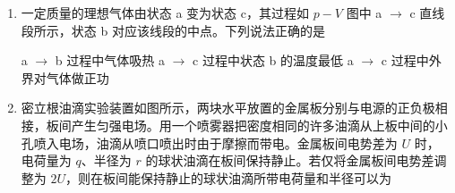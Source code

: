 \documentclass[\gkver]{gaokaozhenti}
\begin{document}
\begin{enumerate}
{	C．已知同步卫星的周期为 $24\Uh$，则根据角速度和周期的关系有 $\omega=\frac{2\pi}{T}$

	由于 $T_\text{同} > T_\text{组合体}$，则组合体的角速度大小比地球同步卫星的大，C 正确；

	D．由题知组合体在地球引力作用下绕地球做圆周运动，有 $G\frac{Mm}{r^{2}}=m\frac{4\pi^{2}}{T^{2}}r$

	整理有 $T=2\pi\sqrt{\frac{r^{3}}{GM}}$

	由于 $T_\text{同} > T_\text{组合体}$，则 $r_\text{同} > r_\text{组合体}$，且同步卫星和组合体在天上有 $ma=G\frac{Mm}{r^{2}}$

	则有 $a_\text{同} < a_\text{组合体}$，D 错误。

	故选 C。
}

\item
一定质量的理想气体由状态 a 变为状态 c，其过程如 $p-V$ 图中 a $\to$ c 直线段所示，状态 b 对应该线段的中点。下列说法正确的是 


{a $\to$ b 过程中气体吸热}
{a $\to$ c 过程中状态 b 的温度最低}
{a $\to$ c 过程中外界对气体做正功}


\item
密立根油滴实验装置如图所示，两块水平放置的金属板分别与电源的正负极相接，板间产生匀强电场。用一个喷雾器把密度相同的许多油滴从上板中间的小孔喷入电场，油滴从喷口喷出时由于摩擦而带电。金属板间电势差为 $U$ 时，电荷量为 $q$、半径为 $r$ 的球状油滴在板间保持静止。若仅将金属板间电势差调整为 $2U$，则在板间能保持静止的球状油滴所带电荷量和半径可以为 


\end{enumerate}
\end{document}
